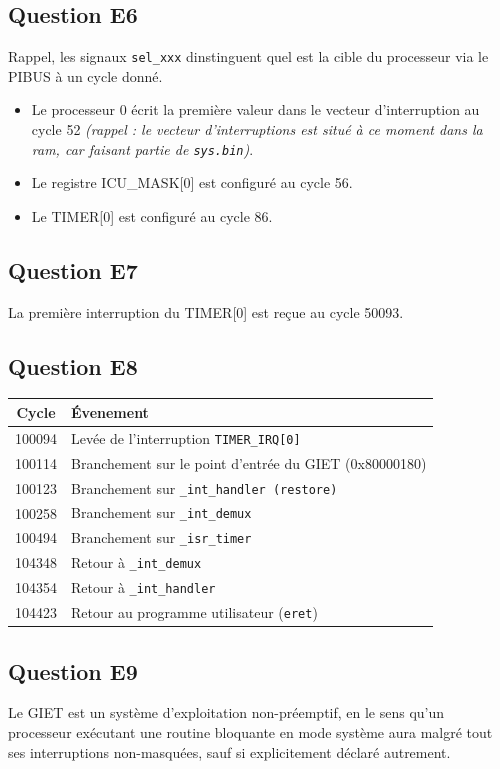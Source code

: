 \documentclass[10pt]{article}
\begin{document}
\subsection{Question E6}
Rappel, les signaux \texttt{sel\_xxx} dinstinguent quel est la cible du
processeur via le PIBUS à un cycle donné.
\begin{itemize}
  \item Le processeur 0 écrit la première valeur dans le vecteur d'interruption
  au cycle 52 {\it (rappel : le vecteur d'interruptions est situé à ce moment
  dans la ram, car faisant partie de \texttt{sys.bin})}.
  \item Le registre ICU\_MASK[0] est configuré au cycle 56.
  \item Le TIMER[0] est configuré au cycle 86.
\end{itemize}

\subsection{Question E7}
La première interruption du TIMER[0] est reçue au cycle 50093.

\subsection{Question E8}
\begin{tabular}{|c|p{4cm}|}
  \hline
  {\bf Cycle} & {\bf Évenement} \\ \hline
  100094 & Levée de l'interruption \texttt{TIMER\_IRQ[0]} \\ \hline
  100114 & Branchement sur le point d'entrée du GIET (0x80000180) \\ \hline
  100123 & Branchement sur \texttt{\_int\_handler (restore)} \\ \hline
  100258 & Branchement sur \texttt{\_int\_demux} \\ \hline
  100494 & Branchement sur \texttt{\_isr\_timer} \\ \hline
  104348 & Retour à \texttt{\_int\_demux} \\ \hline
  104354 & Retour à \texttt{\_int\_handler} \\ \hline
  104423 & Retour au programme utilisateur (\texttt{eret}) \\ \hline
\end{tabular}

\subsection{Question E9}
Le GIET est un système d'exploitation non-préemptif, en le sens qu'un processeur
exécutant une routine bloquante en mode système aura malgré tout ses
interruptions non-masquées, sauf si explicitement déclaré autrement.
\end{document}
